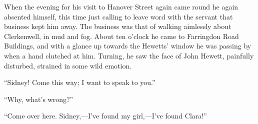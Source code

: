 When the evening for his visit to Hanover Street again came round he
again absented himself, this time just calling to leave word with the
servant that business kept him away. The business was that of walking
aimlessly about Clerkenwell, in mud and fog. About ten o'clock he came
to Farringdon Road Buildings, and with a glance up towards the Hewetts'
window he was passing by when a hand clutched at him. Turning, he saw
the face of John Hewett, painfully disturbed, strained in some wild
emotion.

``Sidney! Come this way; I want to speak to you.''

``Why, what's wrong?''

``Come over here. Sidney,---I've found my girl,---I've found Clara!''
